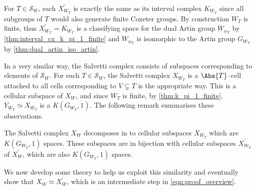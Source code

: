\documentclass[class=article, crop=false]{standalone}
\begin{document}
For $T \in \mathcal{S}_W$, each $X^\prime_{W_T}$ is exactly the same as its interval complex $K_{{W_T}}$ since all subgroups of $T$ would also generate finite Coxeter groups. By construction $W_T$ is finite, thus $X^\prime_{W_T} = K_{W_T}$ is a classifying space for the dual Artin group $W_{w_T}$ by \cref{thm:interval_cx_k_pi_1_finite} and $W_{w_T}$ is isomorphic to the Artin group $G_{W_T}$ by \cref{thm:dual_artin_iso_artin}.

In a very similar way, the Salvetti complex consists of subspaces corresponding to elements of $\mathcal{S}_W$. For each $T \in \mathcal{S}_W$, the Salvetti complex $X_{W_T}$ is a $\Abs{T}$--cell attached to all cells corresponding to $V \subsetneq T$ is the appropriate way. This is a cellular subspace of $X_W$, and since $W_T$ is finite, by \cref{thm:k_pi_1_finite}, $Y_{W_T} \simeq X_{W_T}$ is a $K(G_{W_T},1)$. The following remark summarises these observations.

\begin{remark}
    The Salvetti complex $X_W$ decomposes in to cellular subspaces $X_{W_T}$ which are $K(G_{W_T},1)$ spaces. These subspaces are in bijection with cellular subspaces $X^\prime_{W_T}$ of $X^\prime_W$, which are also $K(G_{W_T},1)$ spaces.
    \label{rmk:salvetti_X_prime_similarities}
\end{remark}

We now develop some theory to help us exploit this similarity and eventually show that $X_W \simeq X^\prime_{W}$, which is an intermediate step in \eqref{eqn:proof_overview}.
\end{document}
